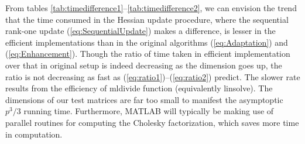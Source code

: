 \documentclass[conference,10.3cpt]{IEEEtran}
\begin{document}
\begin{table}[htbp]
	\centering
		\caption{Time Consumed in Hessian Update Procedure for Different Dimension  $p$
			}
		\label{tab:timedifference1}
	\end{table}
	
	\begin{table}[htbp]
		\centering
			\caption{Time Consumed in Hessian Update Procedure for Different Dimension  $p$
				}
			\label{tab:timedifference2}
		\end{table}

From tables \ref{tab:timedifference1}--\ref{tab:timedifference2}, we can envision the trend that the time consumed in the Hessian update procedure, where the sequential rank-one update (\ref{eq:SequentialUpdate}) makes a difference, is lesser in the efficient implementations than in the original algorithms (\ref{eq:Adaptation}) and (\ref{eq:Enhancement}). Though the ratio of time taken in efficient implementation over that in original setup is indeed decreasing as the dimension goes up, the ratio is not decreasing as fast as (\ref{eq:ratio1})--(\ref{eq:ratio2}) predict. The slower rate results from the efficiency of mldivide function (equivalently linsolve). The dimensions of our test matrices are far too small to manifest the asymptoptic $p^3/3$ running time. Furthermore, MATLAB will typically be making use of parallel routines for computing the Cholesky factorization, which saves more time in computation. 
\end{document}
